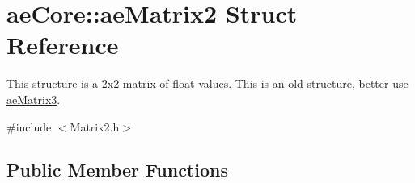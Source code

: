\hypertarget{structae_core_1_1ae_matrix2}{}\section{ae\+Core\+:\+:ae\+Matrix2 Struct Reference}
\label{structae_core_1_1ae_matrix2}


This structure is a 2x2 matrix of float values. This is an old structure, better use \hyperlink{structae_core_1_1ae_matrix3}{ae\+Matrix3}.  




{\ttfamily \#include $<$Matrix2.\+h$>$}

\subsection*{Public Member Functions}

